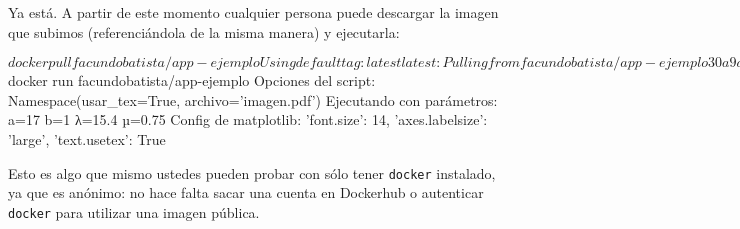 Ya está. A partir de este momento cualquier persona puede descargar la imagen que subimos (referenciándola de la misma manera) y ejecutarla:

\begin{shell}
$ docker pull facundobatista/app-ejemplo
Using default tag: latest
latest: Pulling from facundobatista/app-ejemplo
30a9a79b0d7e: Pull complete 
...
Digest: sha256:6de9f25c02e0ae924f41d3273e01e56939366eef6d830b27e19fcc17818dde04
Status: Downloaded newer image for facundobatista/app-ejemplo:latest
docker.io/facundobatista/app-ejemplo:latest
$ docker run facundobatista/app-ejemplo
Opciones del script: Namespace(usar_tex=True, archivo='imagen.pdf')
Ejecutando con parámetros: a=17 b=1 λ=15.4 µ=0.75
Config de matplotlib: {'font.size': 14, 'axes.labelsize': 'large', 'text.usetex': True}
\end{shell}

Esto es algo que mismo ustedes pueden probar con sólo tener \texttt{docker} instalado, ya que es anónimo: no hace falta sacar una cuenta en Dockerhub o autenticar \texttt{docker} para utilizar una imagen pública.
